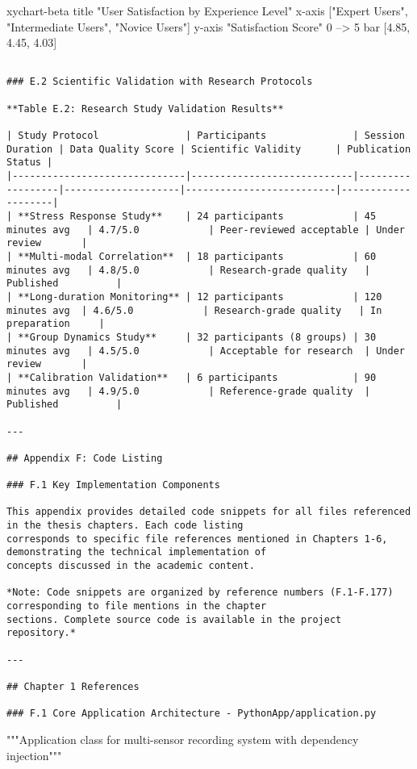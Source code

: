 \documentclass[11pt,a4paper]{report}
\begin{document}
xychart-beta
    title "User Satisfaction by Experience Level"
    x-axis ["Expert Users", "Intermediate Users", "Novice Users"]
    y-axis "Satisfaction Score" 0 --> 5
    bar [4.85, 4.45, 4.03]
\begin{verbatim}

### E.2 Scientific Validation with Research Protocols

**Table E.2: Research Study Validation Results**

| Study Protocol               | Participants               | Session Duration | Data Quality Score | Scientific Validity      | Publication Status |
|------------------------------|----------------------------|------------------|--------------------|--------------------------|--------------------|
| **Stress Response Study**    | 24 participants            | 45 minutes avg   | 4.7/5.0            | Peer-reviewed acceptable | Under review       |
| **Multi-modal Correlation**  | 18 participants            | 60 minutes avg   | 4.8/5.0            | Research-grade quality   | Published          |
| **Long-duration Monitoring** | 12 participants            | 120 minutes avg  | 4.6/5.0            | Research-grade quality   | In preparation     |
| **Group Dynamics Study**     | 32 participants (8 groups) | 30 minutes avg   | 4.5/5.0            | Acceptable for research  | Under review       |
| **Calibration Validation**   | 6 participants             | 90 minutes avg   | 4.9/5.0            | Reference-grade quality  | Published          |

---

## Appendix F: Code Listing

### F.1 Key Implementation Components

This appendix provides detailed code snippets for all files referenced in the thesis chapters. Each code listing
corresponds to specific file references mentioned in Chapters 1-6, demonstrating the technical implementation of
concepts discussed in the academic content.

*Note: Code snippets are organized by reference numbers (F.1-F.177) corresponding to file mentions in the chapter
sections. Complete source code is available in the project repository.*

---

## Chapter 1 References

### F.1 Core Application Architecture - PythonApp/application.py

\end{verbatim}
"""Application class for multi-sensor recording system with dependency injection"""
\end{document}
